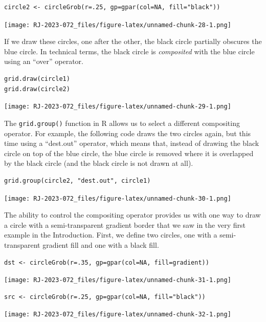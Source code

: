 \begin{verbatim}
circle2 <- circleGrob(r=.25, gp=gpar(col=NA, fill="black"))
\end{verbatim}

\texttt{[image: RJ-2023-072\_files/figure-latex/unnamed-chunk-28-1.png]}

If we draw these circles, one after the other, the black circle
partially obscures the blue circle.
In technical terms, the black circle is \emph{composited} with the
blue circle using an ``over'' operator.

\begin{verbatim}
grid.draw(circle1)
grid.draw(circle2)
\end{verbatim}

\texttt{[image: RJ-2023-072\_files/figure-latex/unnamed-chunk-29-1.png]}

The \texttt{grid.group()} function in R allows us to select a different
compositing operator. For example, the following code
draws the two circles again, but this time using a ``dest.out''
operator, which means that, instead of drawing the black circle
on top of the blue circle, the blue circle is removed where it
is overlapped by the black circle (and the black circle is not
drawn at all).

\begin{verbatim}
grid.group(circle2, "dest.out", circle1)
\end{verbatim}

\texttt{[image: RJ-2023-072\_files/figure-latex/unnamed-chunk-30-1.png]}

The ability to control the compositing operator provides us with
one way to draw a circle with a semi-transparent gradient border
that we saw in the very first example in the Introduction.
First, we define two circles, one with a semi-transparent gradient fill
and one with a black fill.

\begin{verbatim}
dst <- circleGrob(r=.35, gp=gpar(col=NA, fill=gradient))
\end{verbatim}

\texttt{[image: RJ-2023-072\_files/figure-latex/unnamed-chunk-31-1.png]}

\begin{verbatim}
src <- circleGrob(r=.25, gp=gpar(col=NA, fill="black"))
\end{verbatim}

\texttt{[image: RJ-2023-072\_files/figure-latex/unnamed-chunk-32-1.png]}

